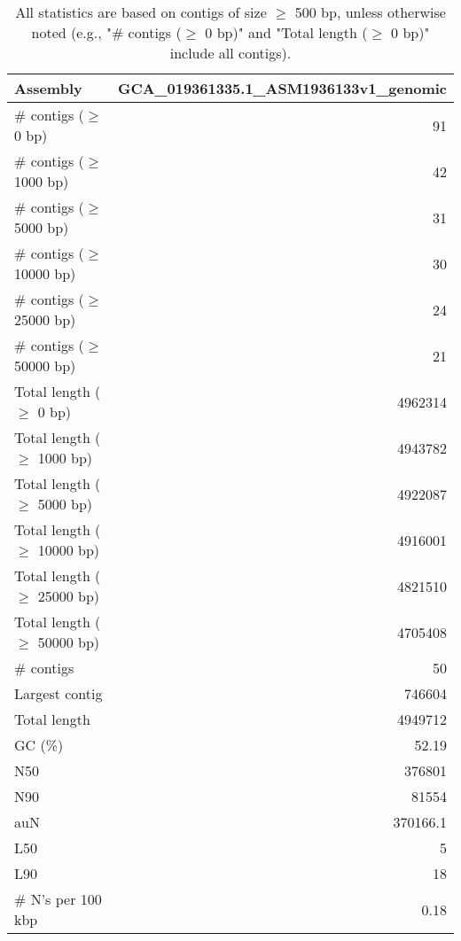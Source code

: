 \documentclass[12pt,a4paper]{article}
\begin{document}
\begin{table}[ht]
\begin{center}
\caption{All statistics are based on contigs of size $\geq$ 500 bp, unless otherwise noted (e.g., "\# contigs ($\geq$ 0 bp)" and "Total length ($\geq$ 0 bp)" include all contigs).}
\begin{tabular}{|l*{1}{|r}|}
\hline
Assembly & GCA\_019361335.1\_ASM1936133v1\_genomic \\ \hline
\# contigs ($\geq$ 0 bp) & 91 \\ \hline
\# contigs ($\geq$ 1000 bp) & 42 \\ \hline
\# contigs ($\geq$ 5000 bp) & 31 \\ \hline
\# contigs ($\geq$ 10000 bp) & 30 \\ \hline
\# contigs ($\geq$ 25000 bp) & 24 \\ \hline
\# contigs ($\geq$ 50000 bp) & 21 \\ \hline
Total length ($\geq$ 0 bp) & 4962314 \\ \hline
Total length ($\geq$ 1000 bp) & 4943782 \\ \hline
Total length ($\geq$ 5000 bp) & 4922087 \\ \hline
Total length ($\geq$ 10000 bp) & 4916001 \\ \hline
Total length ($\geq$ 25000 bp) & 4821510 \\ \hline
Total length ($\geq$ 50000 bp) & 4705408 \\ \hline
\# contigs & 50 \\ \hline
Largest contig & 746604 \\ \hline
Total length & 4949712 \\ \hline
GC (\%) & 52.19 \\ \hline
N50 & 376801 \\ \hline
N90 & 81554 \\ \hline
auN & 370166.1 \\ \hline
L50 & 5 \\ \hline
L90 & 18 \\ \hline
\# N's per 100 kbp & 0.18 \\ \hline
\end{tabular}
\end{center}
\end{table}
\end{document}
